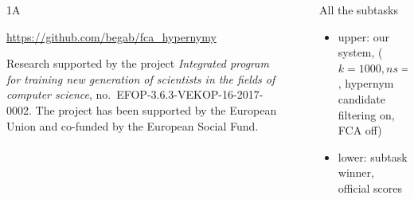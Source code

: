 \documentclass{beamer}
\newlength{\sepwid}
\newlength{\onecolwid}
\begin{document}
\begin{frame}[t]
\begin{columns}[t]
\begin{column}{\onecolwid}
\begin{block}{1A}
    \end{block}

  \vskip3cm
  \begin{alertblock}{} \url{https://github.com/begab/fca_hypernymy} \end{alertblock} 

    \begin{block}{}
        {\footnotesize Research supported by the project \emph{Integrated
        program for training new generation of scientists in the fields of computer
        science}, no.~EFOP-3.6.3-VEKOP-16-2017-0002. The project has been supported
        by the European Union and co-funded by the European Social Fund.}
  \end{block}
\end{column}


\begin{column}{\sepwid} %
\end{column}

\begin{column}{\onecolwid} %
      \begin{block}{All the subtasks}

        

        \begin{itemize}
          \item upper: our system, ($k = 1000, ns = 50$, hypernym candidate
            filtering on, FCA off) 
          \item lower: subtask winner, official scores 
        \end{itemize}


      \end{block}



\end{column}
\end{columns}
\end{frame}
\end{document}
